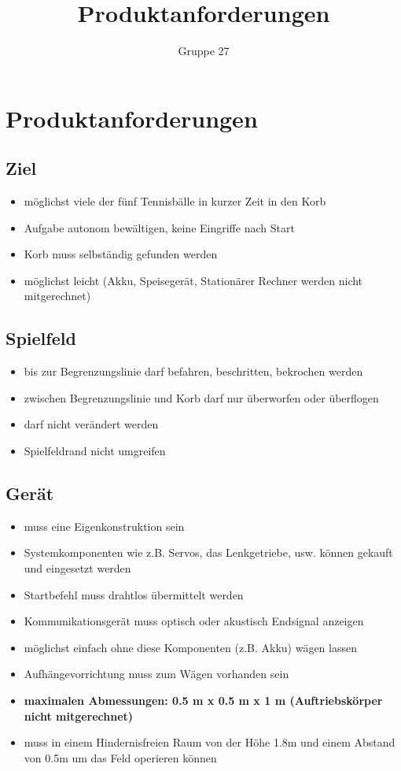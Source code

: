 \documentclass[a4paper,10pt,fleqn]{article}
\title{Produktanforderungen}
\author{Gruppe 27}
\begin{document}

\section{Produktanforderungen}

\subsection{Ziel}
\begin{itemize}
    \item möglichst viele der fünf Tennisbälle in kurzer Zeit in den Korb
    \item Aufgabe autonom bewältigen, keine Eingriffe nach Start
    \item Korb muss selbständig gefunden werden
    \item möglichst leicht (Akku, Speisegerät, Stationärer Rechner werden 
        nicht mitgerechnet)
\end{itemize}

\subsection{Spielfeld}
\begin{itemize}
    \item bis zur Begrenzungslinie darf befahren, beschritten, bekrochen werden
    \item zwischen Begrenzungslinie und Korb darf nur überworfen oder überflogen
    \item darf nicht verändert werden
    \item Spielfeldrand nicht umgreifen
\end{itemize}

\subsection{Gerät}
\begin{itemize}
    \item muss eine Eigenkonstruktion sein
    \item Systemkomponenten wie z.B. Servos, das Lenkgetriebe, usw. können 
        gekauft und eingesetzt werden
    \item Startbefehl muss drahtlos übermittelt werden
    \item Kommunikationsgerät muss optisch oder akustisch Endsignal anzeigen
    \item möglichst einfach ohne diese Komponenten (z.B. Akku) wägen lassen
    \item Aufhängevorrichtung muss zum Wägen vorhanden sein
    \item \textbf{maximalen Abmessungen: 0.5 m x 0.5 m x 1 m (Auftriebskörper 
        nicht mitgerechnet)}
    \item muss in einem Hindernisfreien Raum von der Höhe 1.8m und einem 
        Abstand von 0.5m um das Feld operieren können
\end{itemize}
\end{document}
